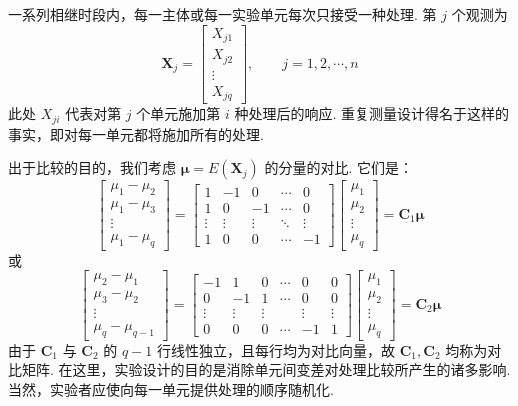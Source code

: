 一系列相继时段内，每一主体或每一实验单元每次只接受一种处理. 第 $j$ 个观测为
\[
\mathbf{X}_j=\begin{bmatrix}X_{j1}\\X_{j2}\\\vdots\\X_{jq}\end{bmatrix},\qquad j=1,2,\cdots,n
\]
此处 $X_{ji}$ 代表对第 $j$ 个单元施加第 $i$ 种处理后的响应. 重复测量设计得名于这样的事实，即对每一单元都将施加所有的处理.

出于比较的目的，我们考虑 $\boldsymbol{\mu}=E(\mathbf{X}_j)$ 的分量的对比. 它们是：
\[
\begin{bmatrix}\mu_1-\mu_2\\\mu_1-\mu_3\\\vdots\\\mu_1-\mu_q\end{bmatrix}
=\begin{bmatrix}1&-1&0&\cdots&0\\1&0&-1&\cdots&0\\\vdots&\vdots&\vdots&\ddots&\vdots\\1&0&0&\cdots&-1\end{bmatrix}
\begin{bmatrix}\mu_1\\\mu_2\\\vdots\\\mu_q\end{bmatrix}
=\mathbf{C}_1\boldsymbol{\mu}
\]
或
\[
\begin{bmatrix}\mu_2-\mu_1\\\mu_3-\mu_2\\\vdots\\\mu_q-\mu_{q-1}\end{bmatrix}
=\begin{bmatrix}-1&1&0&\cdots&0&0\\0&-1&1&\cdots&0&0\\\vdots&\vdots&\vdots&&\vdots&\vdots\\0&0&0&\cdots&-1&1\end{bmatrix}
\begin{bmatrix}\mu_1\\\mu_2\\\vdots\\\mu_q\end{bmatrix}
=\mathbf{C}_2\boldsymbol{\mu}
\]
由于 $\mathbf{C}_1$ 与 $\mathbf{C}_2$ 的 $q-1$ 行线性独立，且每行均为对比向量，故 $\mathbf{C}_1,\mathbf{C}_2$ 均称为对比矩阵. 在这里，实验设计的目的是消除单元间变差对处理比较所产生的诸多影响. 当然，实验者应使向每一单元提供处理的顺序随机化.


